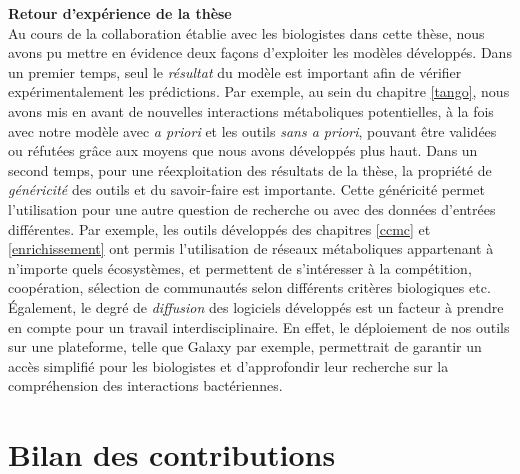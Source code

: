 \documentclass[../main.tex]{subfiles}
\begin{document}
\textbf{Retour d'expérience de la thèse}\\
Au cours de la collaboration établie avec les biologistes dans cette thèse, nous avons pu mettre en évidence deux façons d'exploiter les modèles développés. Dans un premier temps, seul le \textit{résultat} du modèle est important afin de vérifier expérimentalement les prédictions. Par exemple, au sein du chapitre \ref{tango}, nous avons mis en avant de nouvelles interactions métaboliques potentielles, à la fois avec notre modèle  avec \textit{a priori} et les outils \textit{sans a priori}, pouvant être validées ou réfutées grâce aux moyens que nous avons développés plus haut. Dans un second temps, pour une réexploitation des résultats de la thèse, la propriété de \textit{généricité} des outils et du savoir-faire est importante. Cette généricité permet l'utilisation pour une autre question de recherche ou avec des données d'entrées différentes. Par exemple, les outils développés des chapitres \ref{ccmc} et \ref{enrichissement} ont permis l'utilisation de réseaux métaboliques appartenant à n'importe quels écosystèmes, et permettent de s'intéresser à la compétition, coopération, sélection de communautés selon différents critères biologiques etc. Également, le degré de \textit{diffusion} des logiciels développés est un facteur à prendre en compte pour un travail interdisciplinaire. En effet, le déploiement de nos outils sur une plateforme, telle que Galaxy \citep{10.1093/nar/gkac247} par exemple, permettrait de garantir un accès simplifié pour les biologistes et d'approfondir leur recherche sur la compréhension des interactions bactériennes.


\section*{Bilan des contributions}
\end{document}
